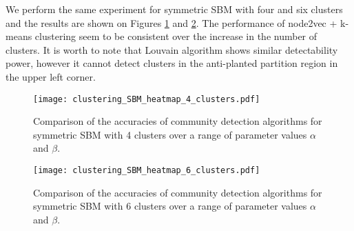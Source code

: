 We perform the same experiment for symmetric SBM with four and six clusters and the results are shown on Figures \ref{fig:comparison_clustering_4clusters} and \ref{fig:comparison_clustering_6clusters}. The performance of node2vec + k-means clustering seem to be consistent over the increase in the number of clusters. It is worth to note that Louvain algorithm shows similar detectability power, however it cannot detect clusters in the anti-planted partition region in the upper left corner.
 
 \begin{figure}[ht]
 \centering
    \texttt{[image: clustering\_SBM\_heatmap\_4\_clusters.pdf]}
   \caption{Comparison of the accuracies of community detection algorithms for symmetric SBM with 4 clusters over a range of parameter values $\alpha$ and $\beta$.}
   \label{fig:comparison_clustering_4clusters}
 \end{figure}
 
  \begin{figure}[ht]
 \centering
    \texttt{[image: clustering\_SBM\_heatmap\_6\_clusters.pdf]}
   \caption{Comparison of the accuracies of community detection algorithms for symmetric SBM with 6 clusters over a range of parameter values $\alpha$ and $\beta$.}
   \label{fig:comparison_clustering_6clusters}
 \end{figure}
 

